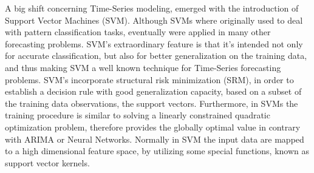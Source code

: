 \par 
A big shift concerning Time-Series modeling, emerged with the introduction of Support Vector Machines (SVM). Although SVMs where originally used to deal with pattern classification tasks, eventually were applied in many other forecasting problems. SVM's extraordinary feature is that it's intended not only for accurate classification, but also for better generalization on the training data, and thus making SVM a well known technique for Time-Series forecasting problems. SVM's incorporate structural risk minimization (SRM), in order to establish a decision rule with good generalization capacity, based on a subset of the training data observations, the support vectors. Furthermore, in SVMs the training procedure is similar to solving a linearly constrained quadratic optimization problem, therefore provides the globally optimal value in contrary with ARIMA or Neural Networks. Normally in SVM the input data are mapped to a high dimensional feature space, by utilizing some special functions, known as support vector kernels.
\\
